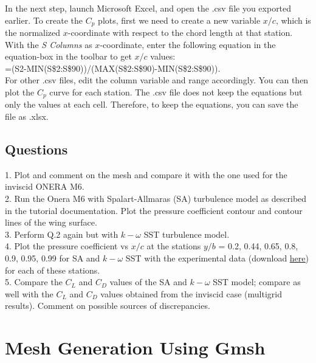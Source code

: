 In the next step, launch Microsoft Excel, and open the .csv file you exported earlier. To create the $C_p$ plots, first we need to create a new
variable $x/c$, which is the normalized $x$-coordinate with respect to the chord length at that station. With the \textit{S Columns} as $x$-coordinate, enter the following equation in the equation-box in the toolbar to get $x/c$ values: \\
=(S2-MIN(S\$2:S\$90))/(MAX(S\$2:S\$90)-MIN(S\$2:S\$90)). \\
For other .csv files, edit the column variable and range accordingly. You can then plot the $C_p$ curve for each station. The .csv file does not keep the equations but only the values at each cell. Therefore, to keep the equations, you can save the file as .xlsx.
\fi
\clearpage
\section{Questions}
1. Plot and comment on the mesh and compare it with the one used for the inviscid ONERA M6. \\
2. Run the Onera M6 with Spalart-Allmaras (SA) turbulence model as described in the tutorial documentation. Plot the pressure coefficient contour and contour lines of the wing surface. \\
3. Perform Q.2 again but with $k-\omega$ SST turbulence model. \\
4. Plot the pressure coefficient vs $x/c$ at the stations $y/b$ = 0.2, 0.44, 0.65, 0.8, 0.9, 0.95, 0.99 for SA and $k-\omega$ SST with the experimental data\cite{schmitt1979pressure} (download \href{https://gitlab.com/bvermeir/book-cfd/blob/master/tutorial/tut5_turbulent_oneram6/experimental_values.zip}{\underline{here}}) for each of these stations. \\
5. Compare the $C_L$ and $C_D$ values of the SA and $k-\omega$ SST model; compare as well with the $C_L$ and $C_D$ values obtained from the inviscid case (multigrid results). Comment on possible sources of discrepancies.
\chapter{Mesh Generation Using Gmsh}
\label{ch:Mesh Generation Unisg Gmsh}
